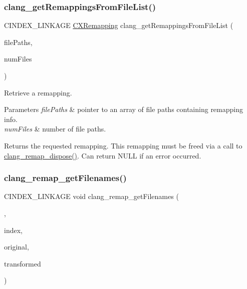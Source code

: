 \subsubsection{\texorpdfstring{clang\+\_\+get\+Remappings\+From\+File\+List()}{clang\_getRemappingsFromFileList()}}
{\footnotesize\ttfamily C\+I\+N\+D\+E\+X\+\_\+\+L\+I\+N\+K\+A\+GE \mbox{\hyperlink{group__CINDEX__REMAPPING_ga04be0aca9e36a130cf1dd6fd8cbd4408}{C\+X\+Remapping}} clang\+\_\+get\+Remappings\+From\+File\+List (\begin{DoxyParamCaption}\item[{const char $\ast$$\ast$}]{file\+Paths,  }\item[{unsigned}]{num\+Files }\end{DoxyParamCaption})}



Retrieve a remapping. 


\begin{DoxyParams}{Parameters}
{\em file\+Paths} & pointer to an array of file paths containing remapping info.\\
\hline
{\em num\+Files} & number of file paths.\\
\hline
\end{DoxyParams}
\begin{DoxyReturn}{Returns}
the requested remapping. This remapping must be freed via a call to {\ttfamily \mbox{\hyperlink{group__CINDEX__REMAPPING_gafbd34560f59e5d3e0f5e746215b12ed7}{clang\+\_\+remap\+\_\+dispose()}}}. Can return N\+U\+LL if an error occurred. 
\end{DoxyReturn}
\mbox{\label{group__CINDEX__REMAPPING_ga22fa206f0879f988bac281390063a9d7}} 
\subsubsection{\texorpdfstring{clang\+\_\+remap\+\_\+get\+Filenames()}{clang\_remap\_getFilenames()}}
{\footnotesize\ttfamily C\+I\+N\+D\+E\+X\+\_\+\+L\+I\+N\+K\+A\+GE void clang\+\_\+remap\+\_\+get\+Filenames (\begin{DoxyParamCaption}\item[{\mbox{\hyperlink{group__CINDEX__REMAPPING_ga04be0aca9e36a130cf1dd6fd8cbd4408}{C\+X\+Remapping}}}]{,  }\item[{unsigned}]{index,  }\item[{\mbox{\hyperlink{structCXString}{C\+X\+String}} $\ast$}]{original,  }\item[{\mbox{\hyperlink{structCXString}{C\+X\+String}} $\ast$}]{transformed }\end{DoxyParamCaption})}



